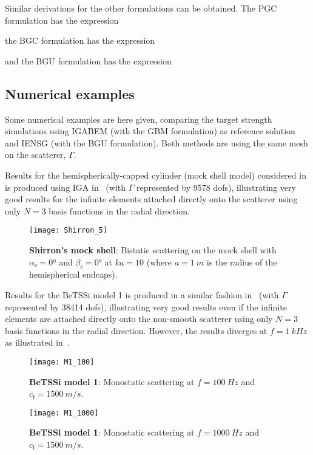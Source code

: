 Similar derivations for the other formulations can be obtained. The PGC formulation has the expression

the BGC formulation has the expression

and the BGU formulation has the expression


\subsection{Numerical examples}
Some numerical examples are here given, comparing the target strength simulations using IGABEM (with the GBM formulation) as reference solution and IENSG (with the BGU formulation). Both methods are using the same mesh on the scatterer, $\Gamma$.

Results for the hemispherically-capped cylinder (mock shell model) considered in~\cite[Fig. 10]{Shirron2002aie} is produced using IGA in~ (with $\Gamma$ represented by \num{9578} dofs), illustrating very good results for the infinite elements attached directly onto the scatterer using only $N=3$ basis functions in the radial direction.
\begin{figure}
	\centering
	\texttt{[image: Shirron\_5]}
	\caption{\textbf{Shirron's mock shell}: Bistatic scattering on the mock shell with $\alpha_{\mathrm{s}} = \ang{0}$ and $\beta_{\mathrm{s}} = \ang{0}$ at $ka=10$ (where $a=\SI{1}{m}$ is the radius of the hemispherical endcaps).}
	\label{Fig3:Shirron}
\end{figure}
Results for the BeTSSi model 1 is produced in a similar fashion in~ (with $\Gamma$ represented by \num{38414} dofs), illustrating very good results even if the infinite elements are attached directly onto the non-smooth scatterer using only $N=3$ basis functions in the radial direction. However, the results diverges at $f=\SI{1}{kHz}$ as illustrated in~.
\begin{figure}
	\centering
	\texttt{[image: M1\_100]}
	\caption{\textbf{BeTSSi model 1}: Monostatic scattering at $f=\SI{100}{Hz}$ and $c_{\mathrm{f}}=\SI{1500}{m/s}$.}
	\label{Fig3:M1_IENSG_100}
\end{figure}
\begin{figure}
	\centering
	\texttt{[image: M1\_1000]}
	\caption{\textbf{BeTSSi model 1}: Monostatic scattering at $f=\SI{1000}{Hz}$ and $c_{\mathrm{f}}=\SI{1500}{m/s}$.}
	\label{Fig3:M1_IENSG_1000}
\end{figure}
